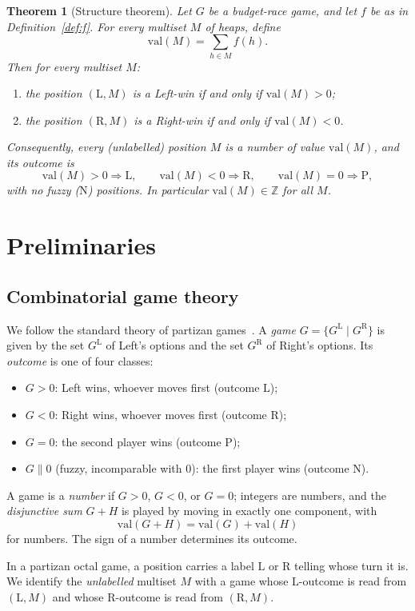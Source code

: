 \documentclass[11pt]{article}
\newtheorem{theorem}{Theorem}[section]
\newcommand{\outL}{\ensuremath{\mathrm{L}}}
\newcommand{\outR}{\ensuremath{\mathrm{R}}}
\newcommand{\outP}{\ensuremath{\mathrm{P}}}
\newcommand{\outN}{\ensuremath{\mathrm{N}}}
\newcommand{\val}{\ensuremath{\mathrm{val}}}
\begin{document}
\begin{theorem}[Structure theorem]\label{thm:main}
Let $G$ be a budget-race game, and let $f$ be as in Definition~\ref{def:f}. For every
multiset $M$ of heaps, define
\[
\val(M)=\sum_{h\in M} f(h).
\]
Then for every multiset $M$:
\begin{enumerate}
\item[(a)] the position $(\outL,M)$ is a Left-win if and only if $\val(M)>0$;
\item[(b)] the position $(\outR,M)$ is a Right-win if and only if $\val(M)<0$.
\end{enumerate}
Consequently, every (unlabelled) position $M$ is a \emph{number} of value $\val(M)$, and its
outcome is
\[
\val(M)>0\Rightarrow \outL,\qquad \val(M)<0\Rightarrow \outR,\qquad \val(M)=0\Rightarrow \outP,
\]
with no fuzzy ($\outN$) positions. In particular $\val(M)\in\mathbb{Z}$ for all $M$.
\end{theorem}

\section{Preliminaries}\label{sec:prelim}

\subsection{Combinatorial game theory}

We follow the standard theory of partizan games~\cite{ONAG,WinningWays,SiegelCGT}. A
\emph{game} $G=\{G^{\outL}\mid G^{\outR}\}$ is given by the set $G^{\outL}$ of Left's options
and the set $G^{\outR}$ of Right's options. Its \emph{outcome} is one of four classes:
\begin{itemize}
\item $G>0$: Left wins, whoever moves first (outcome $\outL$);
\item $G<0$: Right wins, whoever moves first (outcome $\outR$);
\item $G=0$: the second player wins (outcome $\outP$);
\item $G\parallel 0$ (fuzzy, incomparable with $0$): the first player wins (outcome $\outN$).
\end{itemize}
A game is a \emph{number} if $G>0$, $G<0$, or $G=0$; integers are numbers, and the
\emph{disjunctive sum} $G+H$ is played by moving in exactly one component, with
\[
\val(G+H)=\val(G)+\val(H)
\]
for numbers. The sign of a number determines its outcome.

In a partizan octal game, a position carries a label $\outL$ or $\outR$ telling whose turn it
is. We identify the \emph{unlabelled} multiset $M$ with a game whose $\outL$-outcome is read
from $(\outL,M)$ and whose $\outR$-outcome is read from $(\outR,M)$.
\end{document}
